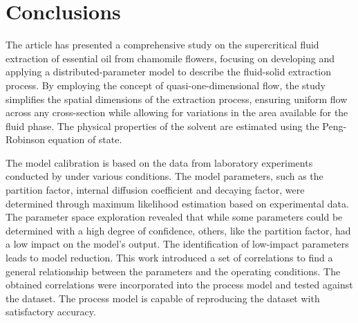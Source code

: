 \documentclass[a4paper,fleqn]{cas-dc}
\begin{document}
\section{Conclusions} \label{CH: Conclusion}

The article has presented a comprehensive study on the supercritical fluid extraction of essential oil from chamomile flowers, focusing on developing and applying a distributed-parameter model to describe the fluid-solid extraction process. By employing the concept of quasi-one-dimensional flow, the study simplifies the spatial dimensions of the extraction process, ensuring uniform flow across any cross-section while allowing for variations in the area available for the fluid phase. The physical properties of the solvent are estimated using the Peng-Robinson equation of state.

The model calibration is based on the data from laboratory experiments conducted by \citet{Povh2001} under various conditions. The model parameters, such as the partition factor, internal diffusion coefficient and decaying factor, were determined through maximum likelihood estimation based on experimental data. The parameter space exploration revealed that while some parameters could be determined with a high degree of confidence, others, like the partition factor, had a low impact on the model's output. The identification of low-impact parameters leads to model reduction. This work introduced a set of correlations to find a general relationship between the parameters and the operating conditions. The obtained correlations were incorporated into the process model and tested against the dataset. The process model is capable of reproducing the dataset with satisfactory accuracy.


\newpage
%



\clearpage \appendix \label{appendix}
\end{document}
